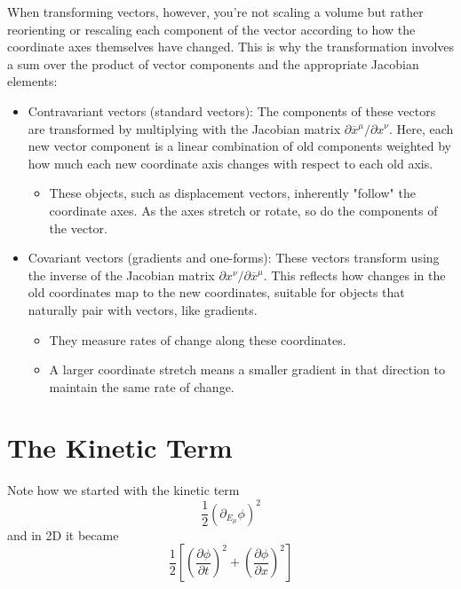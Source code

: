 When transforming vectors, however, you're not scaling a volume but rather reorienting or rescaling each component
of the vector according to how the coordinate axes themselves have changed.
This is why the transformation involves a sum over the product of vector components and the appropriate Jacobian elements:

\begin{itemize}
\item Contravariant vectors (standard vectors): The components of these vectors are transformed by multiplying with the
    Jacobian matrix $\partial \overline{x}^\mu / \partial x^\nu$. Here, each new vector component is a linear combination
    of old components weighted by how much each new coordinate axis changes with respect to each old axis.
    \begin{itemize}
        \item These objects, such as displacement vectors, inherently "follow" the coordinate axes. As the axes stretch
        or rotate, so do the components of the vector. 
    \end{itemize}
\item Covariant vectors (gradients and one-forms): These vectors transform using the inverse of the Jacobian matrix
    $\partial x^\nu / \partial \overline{x}^\mu$. This reflects how changes in the old coordinates map to the new
    coordinates, suitable for objects that naturally pair with vectors, like gradients.
    \begin{itemize}
        \item They measure rates of change along these coordinates.
        \item A larger coordinate stretch means a smaller gradient in that direction to maintain the same rate of change.
    \end{itemize}
\end{itemize}





\section{The Kinetic Term}

Note how we started with the kinetic term
$$
\frac{1}{2} \left( \partial_{E_\mu} \phi \right)^2
$$
and in 2D it became
$$
\frac{1}{2} \left[ 
    \left( \frac{\partial \phi}{\partial t} \right)^2 +  \left( \frac{\partial \phi}{\partial x} \right)^2
\right]
$$


